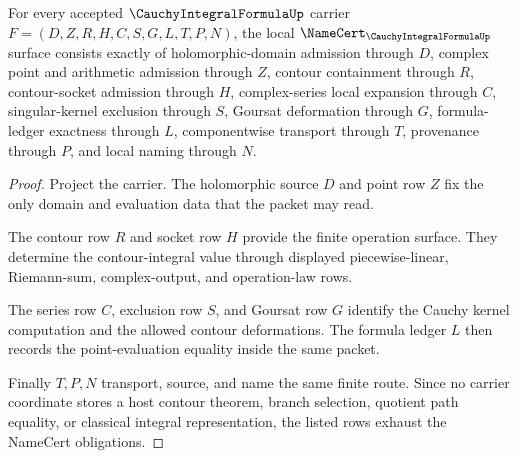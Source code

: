 \begin{theorem}
\label{thm:cauchy-integral-formula-namecert-obligations}
For every accepted $\CauchyIntegralFormulaUp$ carrier $F=(D,Z,R,H,C,S,G,L,T,P,N)$, the local $\NameCert_{\CauchyIntegralFormulaUp}$ surface consists exactly of holomorphic-domain admission through $D$, complex point and arithmetic admission through $Z$, contour containment through $R$, contour-socket admission through $H$, complex-series local expansion through $C$, singular-kernel exclusion through $S$, Goursat deformation through $G$, formula-ledger exactness through $L$, componentwise transport through $T$, provenance through $P$, and local naming through $N$.
\end{theorem}
\begin{proof}
Project the carrier. The holomorphic source $D$ and point row $Z$ fix the only domain and evaluation data that the packet may read.

The contour row $R$ and socket row $H$ provide the finite operation surface. They determine the contour-integral value through displayed piecewise-linear, Riemann-sum, complex-output, and operation-law rows.

The series row $C$, exclusion row $S$, and Goursat row $G$ identify the Cauchy kernel computation and the allowed contour deformations. The formula ledger $L$ then records the point-evaluation equality inside the same packet.

Finally $T,P,N$ transport, source, and name the same finite route. Since no carrier coordinate stores a host contour theorem, branch selection, quotient path equality, or classical integral representation, the listed rows exhaust the NameCert obligations.
\end{proof}


